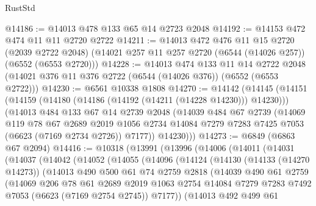 \begin{lexlean}{RustStd}
\begin{coremodule}
@14186 := @14013 @478 @133 @65 @14 @2723 @2048
@14192 := @14153 @472 @474 @11 @11 @2720 @2722
@14211 := @14013
    @472
    @476
    @11
    @15
    @2720
    (@2039 @2722 @2048)
    (@14021 @257 @11 @257 @2720 (@6544 (@14026 @257)) (@6552 (@6553 @2720)))
@14228 := @14013
    @474
    @133
    @11
    @14
    @2722
    @2048
    (@14021 @376 @11 @376 @2722 (@6544 (@14026 @376)) (@6552 (@6553 @2722)))
@14230 := @6561 @10338 @1808
@14270 := @14142
    (@14145
      (@14151
        (@14159 (@14180 (@14186 (@14192 (@14211 (@14228 @14230))) @14230)))
        (@14013
          @484
          @133
          @67
          @14
          @2739
          @2048
          (@14039
            @484
            @67
            @2739
            (@14069
              @119
              @78
              @67
              @2689
              @2019
              @1056
              @2734
              @14084
              @7279
              @7283
              @7425
              @7053
              (@6623 (@7169 @2734 @2726))
              @7177))
          @14230)))
@14273 := @6849 (@6863 @67 @2094)
@14416 := @10318
    (@13991
      (@13996
        (@14006
          (@14011
            (@14031
              (@14037
                (@14042
                  (@14052
                    (@14055
                      (@14096
                        (@14124
                          (@14130
                            (@14133 (@14270 @14273))
                            (@14013
                              @490
                              @500
                              @61
                              @74
                              @2759
                              @2818
                              (@14039
                                @490
                                @61
                                @2759
                                (@14069
                                  @206
                                  @78
                                  @61
                                  @2689
                                  @2019
                                  @1063
                                  @2754
                                  @14084
                                  @7279
                                  @7283
                                  @7492
                                  @7053
                                  (@6623 (@7169 @2754 @2745))
                                  @7177))
                              (@14013
                                @492
                                @499
                                @61

\end{coremodule}
\end{lexlean}
